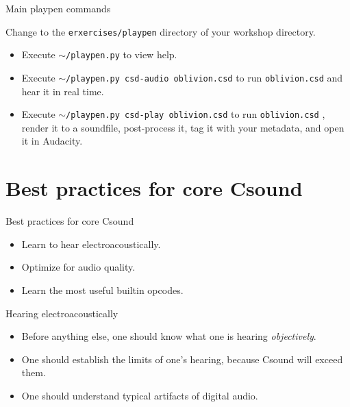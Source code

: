 \documentclass{beamer}
\begin{document}
\begin{frame}{Main playpen commands}
\begin{example}
Change to the \texttt{erxercises/playpen} directory of your workshop directory.
\begin{itemize}
\item Execute \texttt{$\sim$/playpen.py} to view help.
\item Execute \texttt{$\sim$/playpen.py csd-audio oblivion.csd} to run \texttt{oblivion.csd} and hear it in real time.
\item Execute \texttt{$\sim$/playpen.py csd-play oblivion.csd} to run \texttt{oblivion.csd} , render it to a soundfile, post-process it, tag it with your metadata, and open it in Audacity.
\end{itemize}
\end{example}
\end{frame}

\section{Best practices for core Csound}
\begin{frame}{Best practices for core Csound}
\begin{itemize}
\item Learn to hear electroacoustically.
\item Optimize for audio quality.
\item Learn the most useful builtin opcodes.
\end{itemize}
\end{frame}

\begin{frame}{Hearing electroacoustically}
\begin{itemize}
\item Before anything else, one should know what one is hearing \textit{objectively}.
\item One should establish the limits of one's hearing, because Csound will exceed them.
\item One should understand typical artifacts of digital audio.
\end{itemize}
\end{frame}
\end{document}

